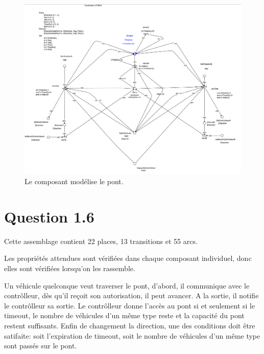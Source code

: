 \documentclass[a4paper,11pt]{report}
\begin{document}
	\begin{figure}[!htbp]
		\includegraphics[width = 18cm]{ctrlpModel.png}
		\caption{Le composant modélise le pont.}
	\end{figure}
	\newpage
	
\section{Question 1.6}
	Cette assemblage contient 22 places, 13 transitions et 55$  $ arcs.
	
	Les propriétés attendues sont vérifiées dans chaque composant individuel, donc elles sont vérifiées lorsqu'on les rassemble.
	
	Un véhicule quelconque veut traverser le pont, d'abord, il communique avec le contrôlleur, dès qu'il reçoit son autorisation, il peut avancer. A la sortie, il notifie le contrôlleur sa sortie. Le contrôlleur donne l'accès au pont si et seulement si le timeout, le nombre de véhicules d'un même type reste et la capacité du pont restent suffisants. Enfin de changement la direction, une des conditions doit être satifaite: soit l'expiration de timeout, soit le nombre de véhicules d'un même type sont passés sur le pont. 
	
\end{document}
